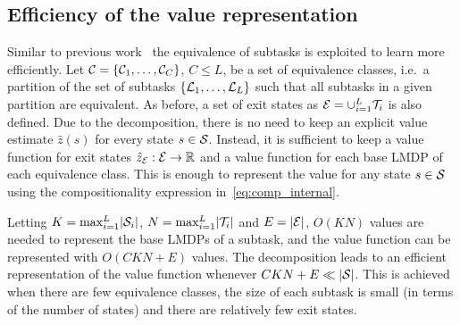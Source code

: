 \subsection{Efficiency of the value representation}
 Similar to previous work~\citep{Wen2020,Infante2022} the equivalence of subtasks is exploited to learn more efficiently. Let $\mathcal{C}=\{\mathcal{C}_1,\ldots,\mathcal{C}_C\}$, $C\leq L$, be a set of equivalence classes, i.e.~a partition of the set of subtasks $\{\mathcal{L}_1,\ldots,\mathcal{L}_L\}$ such that all subtasks in a given partition are equivalent.
As before, a set of exit states as $\mathcal{E}=\cup_{i=1}^L\mathcal{T}_i$ is also defined.
Due to the decomposition, there is no need to keep an explicit value estimate $\hat z(s)$ for every state $s\in\mathcal{S}$. Instead, it is sufficient to keep a value function for exit states $\hat z_{\mathcal{E}}: \mathcal{E}\rightarrow\mathbb{R}$ and a value function for each base LMDP of each equivalence class. This is enough to represent the value for any state $s\in\mathcal{S}$ using the compositionality expression in~\eqref{eq:comp_internal}.

Letting $K=\max_{i=1} ^L\lvert\mathcal{S}_i\rvert$,  $N=\max_{i=1} ^L\lvert\mathcal{T}_i\rvert$ and $E=\lvert\mathcal{E}\rvert$, $O(KN)$ values are needed to represent the base LMDPs of a subtask, and the value function can be represented with $O(CKN + E)$ values. The decomposition leads to an efficient representation of the value function whenever $CKN + E \ll \lvert\mathcal{S}\rvert$. This is achieved when there are few equivalence classes, the size of each subtask is small (in terms of the number of states) and there are relatively few exit states.


